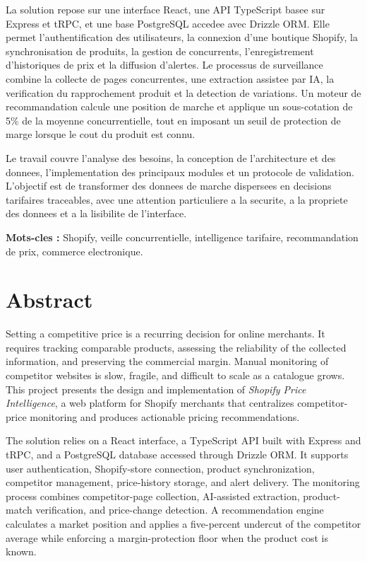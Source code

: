 \documentclass[12pt,a4paper,oneside]{report}
\begin{document}
La solution repose sur une interface React, une API TypeScript basee sur Express et tRPC, et une base PostgreSQL accedee avec Drizzle ORM. Elle permet l'authentification des utilisateurs, la connexion d'une boutique Shopify, la synchronisation de produits, la gestion de concurrents, l'enregistrement d'historiques de prix et la diffusion d'alertes. Le processus de surveillance combine la collecte de pages concurrentes, une extraction assistee par IA, la verification du rapprochement produit et la detection de variations. Un moteur de recommandation calcule une position de marche et applique un sous-cotation de 5\% de la moyenne concurrentielle, tout en imposant un seuil de protection de marge lorsque le cout du produit est connu.

Le travail couvre l'analyse des besoins, la conception de l'architecture et des donnees, l'implementation des principaux modules et un protocole de validation. L'objectif est de transformer des donnees de marche dispersees en decisions tarifaires traceables, avec une attention particuliere a la securite, a la propriete des donnees et a la lisibilite de l'interface.

\noindent\textbf{Mots-cles :} Shopify, veille concurrentielle, intelligence tarifaire, recommandation de prix, commerce electronique.
\clearpage

\chapter*{Abstract}
\thispagestyle{plain}
Setting a competitive price is a recurring decision for online merchants. It requires tracking comparable products, assessing the reliability of the collected information, and preserving the commercial margin. Manual monitoring of competitor websites is slow, fragile, and difficult to scale as a catalogue grows. This project presents the design and implementation of \textit{Shopify Price Intelligence}, a web platform for Shopify merchants that centralizes competitor-price monitoring and produces actionable pricing recommendations.

The solution relies on a React interface, a TypeScript API built with Express and tRPC, and a PostgreSQL database accessed through Drizzle ORM. It supports user authentication, Shopify-store connection, product synchronization, competitor management, price-history storage, and alert delivery. The monitoring process combines competitor-page collection, AI-assisted extraction, product-match verification, and price-change detection. A recommendation engine calculates a market position and applies a five-percent undercut of the competitor average while enforcing a margin-protection floor when the product cost is known.
\end{document}
